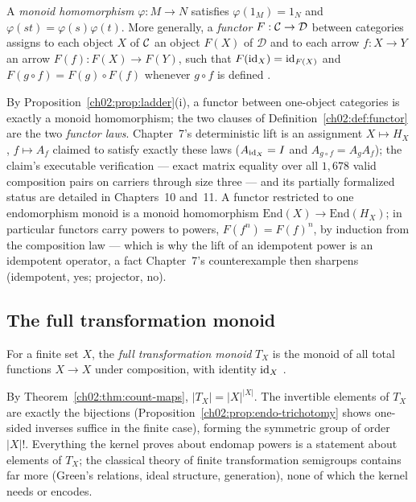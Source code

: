 \begin{definition}\label{ch02:def:functor}
A \emph{monoid homomorphism} $\varphi : M \to N$ satisfies
$\varphi(1_M) = 1_N$ and $\varphi(st) = \varphi(s)\varphi(t)$. More
generally, a \emph{functor} $F : \mathcal{C} \to \mathcal{D}$ between categories
assigns to each object $X$ of $\mathcal{C}$ an object $F(X)$ of $\mathcal{D}$ and
to each arrow $f : X \to Y$ an arrow $F(f) : F(X) \to F(Y)$, such that
$F(\mathrm{id}_X) = \mathrm{id}_{F(X)}$ and $F(g \circ f) = F(g) \circ F(f)$ whenever
$g \circ f$ is defined \cite{maclanecwm}.
\end{definition}

By Proposition~\ref{ch02:prop:ladder}(i), a functor between one-object
categories is exactly a monoid homomorphism; the two clauses of
Definition~\ref{ch02:def:functor} are the two \emph{functor laws}.
Chapter~7's deterministic lift is an assignment
$X \mapsto H_X$, $f \mapsto A_f$ claimed to satisfy exactly these laws
($A_{\mathrm{id}_X} = I$ and $A_{g \circ f} = A_g A_f$); the claim's executable
verification --- exact matrix equality over all $1{,}678$ valid
composition pairs on carriers through size three --- and its partially
formalized status are detailed in Chapters~10 and~11. A functor
restricted to one endomorphism monoid is a monoid homomorphism
$\mathrm{End}(X) \to \mathrm{End}(H_X)$; in particular functors carry
powers to powers, $F(f^n) = F(f)^n$, by induction from the composition
law --- which is why the lift of an idempotent power is an idempotent
operator, a fact Chapter~7's counterexample then sharpens (idempotent,
yes; projector, no).

\subsection{The full transformation monoid}

\begin{definition}\label{ch02:def:full-transf}
For a finite set $X$, the \emph{full transformation monoid} $T_X$ is the
monoid of all total functions $X \to X$ under composition, with identity
$\mathrm{id}_X$ \cite{howie}.
\end{definition}

By Theorem~\ref{ch02:thm:count-maps}, $|T_X| = |X|^{|X|}$. The
invertible elements of $T_X$ are exactly the bijections
(Proposition~\ref{ch02:prop:endo-trichotomy} shows one-sided inverses
suffice in the finite case), forming the symmetric group of order $|X|!$.
Everything the kernel proves about endomap powers is a statement about
elements of $T_X$; the classical theory of finite transformation
semigroups \cite{howie, pin} contains far more (Green's relations,
ideal structure, generation), none of which the kernel needs or encodes.

